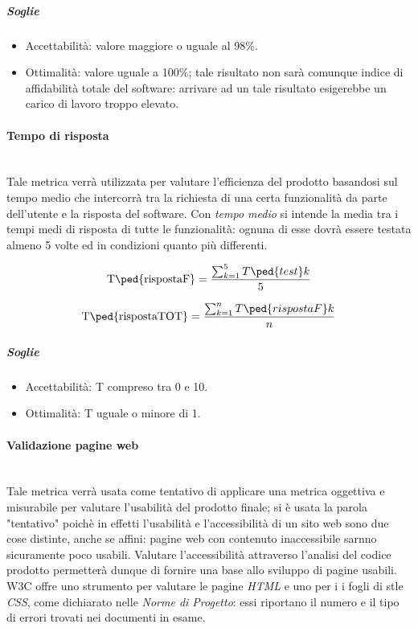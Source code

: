 	\subparagraph{Soglie}
	\begin{itemize}
	\item Accettabilità: valore maggiore o uguale al 98\%.
	\item Ottimalità: valore uguale a 100\%; tale risultato non sarà comunque indice di affidabilità totale del software: arrivare ad un tale risultato esigerebbe un carico di lavoro troppo elevato.
	\end{itemize}
	
\paragraph{Tempo di risposta}
\label{AppB:Efficienza}
	~\\Tale metrica verrà utilizzata per valutare l'efficienza del prodotto basandosi sul tempo medio che intercorrà tra la richiesta di una certa funzionalità da parte dell'utente e la risposta del software. Con \textit{tempo medio} si intende la media tra i tempi medi di risposta di tutte le funzionalità: ognuna di esse dovrà essere testata almeno 5 volte ed in condizioni quanto più differenti.
	
	\begin{displaymath}
		\mbox{T\ped{rispostaF}} =\frac{\sum_{k=1}^5 T\ped{test}k}{5}
	\end{displaymath}
	
	\begin{displaymath}
		\mbox{T\ped{rispostaTOT}} =\frac{\sum_{k=1}^n T\ped{rispostaF}k}{n}
	\end{displaymath}
	
	\subparagraph{Soglie}
	\begin{itemize}
	\item Accettabilità: T compreso tra 0 e 10.
	\item Ottimalità: T uguale o minore di 1.
	\end{itemize}
	 
\paragraph{Validazione pagine web}
\label{AppB:Usabilita}
	~\\Tale metrica verrà usata come tentativo di applicare una metrica oggettiva e misurabile per valutare l'usabilità del prodotto finale; si è usata la parola "tentativo" poichè in effetti l'usabilità e l'accessibilità di un sito web sono due cose distinte, anche se affini: pagine web con contenuto inaccessibile sarnno sicuramente poco usabili. Valutare l'accessibilità attraverso l'analisi del codice prodotto permetterà dunque di fornire una base allo sviluppo di pagine usabili.
W3C offre uno strumento per valutare le pagine \emph{HTML} e uno per i i fogli di stle \emph{CSS}, come dichiarato nelle \emph{Norme di Progetto}: essi riportano il numero e il tipo di errori trovati nei documenti in esame.

